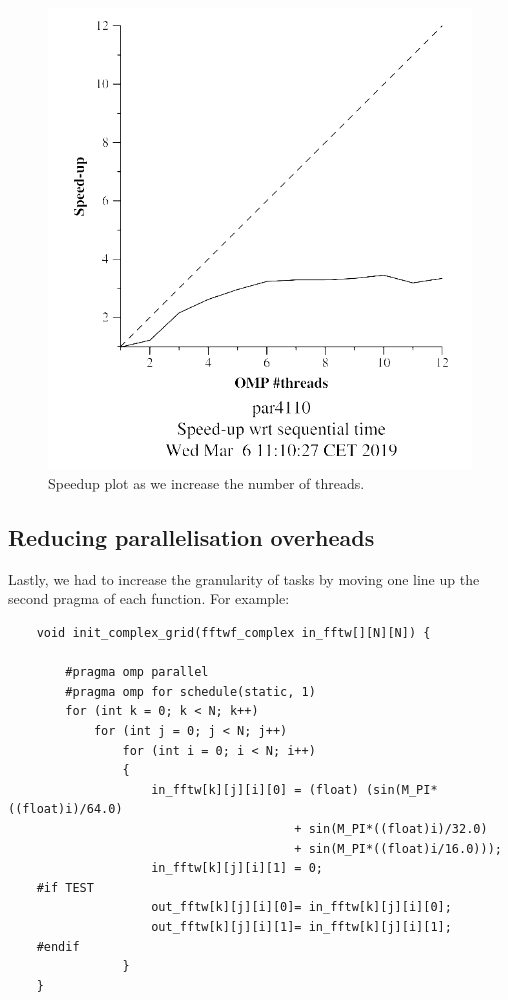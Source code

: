 \documentclass[12pt, a4paper]{article}
\begin{document}
\begin{figure}[H]
\begin{minipage}[b]{0.45\linewidth}
\includegraphics[width=\textwidth]{./images/speed_v2}

\caption{Speedup plot as we increase the number of threads.}
\label{fig:speed_v1}
\end{minipage}
\end{figure}

\subsection{Reducing parallelisation overheads}

Lastly, we had to increase the granularity of tasks by moving one line up the second pragma of each function. For example:

\begin{lstlisting}
	void init_complex_grid(fftwf_complex in_fftw[][N][N]) {
	
		#pragma omp parallel
		#pragma omp for schedule(static, 1)
		for (int k = 0; k < N; k++) 
			for (int j = 0; j < N; j++)
				for (int i = 0; i < N; i++)
				{
					in_fftw[k][j][i][0] = (float) (sin(M_PI*((float)i)/64.0)
										+ sin(M_PI*((float)i)/32.0)
										+ sin(M_PI*((float)i/16.0)));
					in_fftw[k][j][i][1] = 0;
	#if TEST
					out_fftw[k][j][i][0]= in_fftw[k][j][i][0];
					out_fftw[k][j][i][1]= in_fftw[k][j][i][1];
	#endif
				}
	}
\end{lstlisting}
\end{document}
